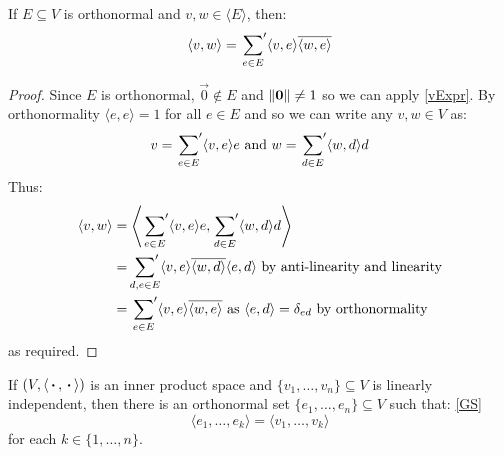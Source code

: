 \documentclass[../main.tex]{subfiles}
\begin{document}
\begin{corollary}
  If $E \subseteq V$ is orthonormal and $v, w \in \langle E \rangle$, then:
  \[
    \langle v, w \rangle = \sideset{}{'}\sum_{e \in E} \langle v, e \rangle \overline{\langle w, e \rangle}
  \]
\end{corollary}
\begin{proof}
  Since $E$ is orthonormal, $\vec{0} \notin E$ and $\left\lVert \mathbf{\bm{0}} \right\rVert \neq 1$ so we can apply \cref{vExpr}.
  By orthonormality $\langle e, e \rangle = 1$ for all $e \in E$ and so we can write any $v, w \in V$ as:
  \[
    v = \sideset{}{'}\sum_{e \in E} \langle v, e \rangle e \text{ and } w = \sideset{}{'}\sum_{d \in E} \langle w, d \rangle d
  \]
  Thus:
  \begin{align*}
    \langle v, w \rangle &= \left\langle \sideset{}{'}\sum_{e \in E} \langle v, e \rangle e, \sideset{}{'}\sum_{d \in E} \langle w, d \rangle d \right\rangle \\
                         &= \sideset{}{'}\sum_{d, e \in E} \langle v, e \rangle \overline{\langle w, d \rangle} \langle e, d \rangle \text{ by anti-linearity and linearity} \\
                         &= \sideset{}{'}\sum_{e \in E} \langle v, e \rangle \overline{\langle w, e \rangle} \text{ as $\langle e, d \rangle = \delta_{e d}$ by orthonormality}
  \end{align*}
  as required.
\end{proof}
\begin{theorem}
  If $(V, \langle {\hspace{0.18em}\boldsymbol{\cdot}\hspace{0.18em}}, {\hspace{0.18em}\boldsymbol{\cdot}\hspace{0.18em}} \rangle)$ is an inner product space and $\{v_1, \ldots, v_n\} \subseteq V$ is linearly independent, then there is an orthonormal set $\{e_1, \ldots, e_n\} \subseteq V$ such that: \cref{GS}
  \[
    \langle e_1, \ldots, e_k \rangle = \langle v_1, \ldots, v_k \rangle
  \]
  for each $k \in \{1, \ldots, n\}$.
\end{theorem}
\end{document}
